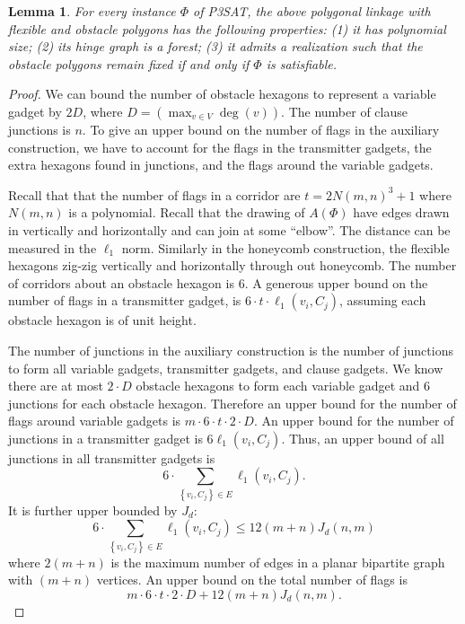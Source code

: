 \documentclass[10pt]{CSUNthesis}
\theoremstyle{plain}%
\newtheorem{lem}{Lemma}
\theoremstyle{definition}
\theoremstyle{remark}
\newcommand{\lr}[1]{\left( #1 \right)}
\begin{document}
\begin{lem}\label{lem:aux-A}
For every instance $\Phi$ of P3SAT, the above polygonal linkage with flexible and obstacle polygons has the following properties: (1) it has polynomial size; (2) its hinge graph is a forest;
(3) it admits a realization such that the obstacle polygons remain fixed if and only if $\Phi$ is satisfiable.
\end{lem}
\begin{proof}

We can bound the number of obstacle hexagons to represent a variable gadget by $2 D$, where $D = \lr{ \max_{v \in V} \deg (v)}$.  
The number of clause junctions is $n$.
To give an upper bound on the number of flags in the auxiliary construction, we have to account for the flags in the transmitter gadgets, the extra hexagons found in junctions, and the flags around the variable gadgets.

Recall that that the number of flags in a corridor are $ t = 2N(m,n)^3 + 1 $ where $N(m,n)$ is a polynomial. 
Recall that the drawing of $A(\Phi)$ have edges drawn in vertically and horizontally and can join at some ``elbow''.  
The distance can be measured in the $\ell_1$ norm.
Similarly in the honeycomb construction, the flexible hexagons zig-zig vertically and horizontally through out honeycomb.  
The number of corridors about an obstacle hexagon is $6$.
A generous upper bound on the number of flags in a transmitter gadget, is $6 \cdot t \cdot \ell_1\lr{v_i,C_j}$, assuming each obstacle hexagon is of unit height.

The number of junctions in the auxiliary construction is the number of junctions to form all variable gadgets, transmitter gadgets, and clause gadgets. 
We know there are at most $2 \cdot D$ obstacle hexagons to form each variable gadget and $6$ junctions for each obstacle hexagon.  
Therefore an upper bound for the number of flags around variable gadgets is $m \cdot 6 \cdot t \cdot 2 \cdot D$.
An upper bound for the number of junctions in a transmitter gadget is $6 \ell_1 \lr{v_i, C_j}$.  
Thus, an upper bound of all junctions in all transmitter gadgets is $$6 \cdot \sum_{\left\lbrace v_i, C_j \right\rbrace \in E} \ell_1 \lr{v_i, C_j}.$$
It is further upper bounded by  $J_d$:
$$6 \cdot \sum_{\left\lbrace v_i, C_j \right\rbrace \in E} \ell_1 \lr{v_i, C_j} \leq 12 (m+n) J_d(n,m)$$
where $2 (m+n)$ is the maximum number of edges in a planar bipartite graph with $(m+n)$ vertices.  
An upper bound on the total number of flags is
$$m \cdot 6 \cdot t \cdot 2 \cdot D + 12 (m+n) J_d(n,m).$$


\end{proof}
\end{document}
